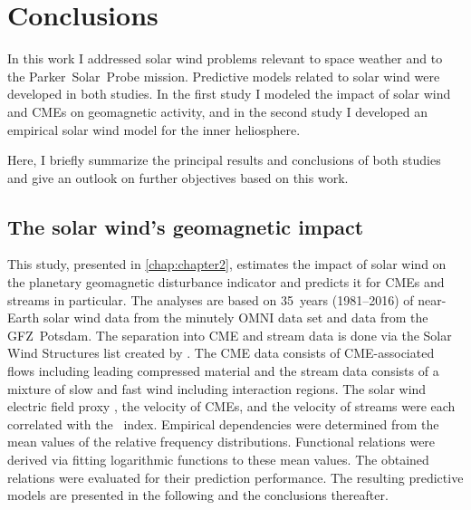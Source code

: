 
\chapter{Conclusions}
\label{chap:summary}

In this work I addressed solar wind problems relevant to space weather and to the Parker~Solar~Probe mission. Predictive models related to solar wind were developed in both studies. In the first study I modeled the impact of solar wind and CMEs on geomagnetic activity, and in the second study I developed an empirical solar wind model for the inner heliosphere.

Here, I briefly summarize the principal results and conclusions of both studies and give an outlook on further objectives based on this work.

\section{The solar wind's geomagnetic impact}
This study, presented in \autoref{chap:chapter2}, estimates the impact of solar wind on the planetary geomagnetic disturbance indicator \Kp{} and predicts it for CMEs and streams in particular.
The analyses are based on 35~years (1981--2016) of near-Earth solar wind data from the minutely OMNI data set and \Kp{} data from the GFZ~Potsdam. The separation into CME and stream data is done via the Solar Wind Structures list created by \citet{Richardson2000}. The CME data consists of CME-associated flows including leading compressed material and the stream data consists of a mixture of slow and fast wind including interaction regions. The solar wind electric field proxy \vBz{}, the velocity of CMEs, and the velocity of streams were each correlated with the \Kp~index. Empirical dependencies were determined from the mean values of the relative \Kp{} frequency distributions. Functional relations were derived via fitting logarithmic functions to these mean \Kp{} values.
The obtained \Kp{} relations were evaluated for their prediction performance. The resulting predictive models are presented in the following and the conclusions thereafter.

\medskip


